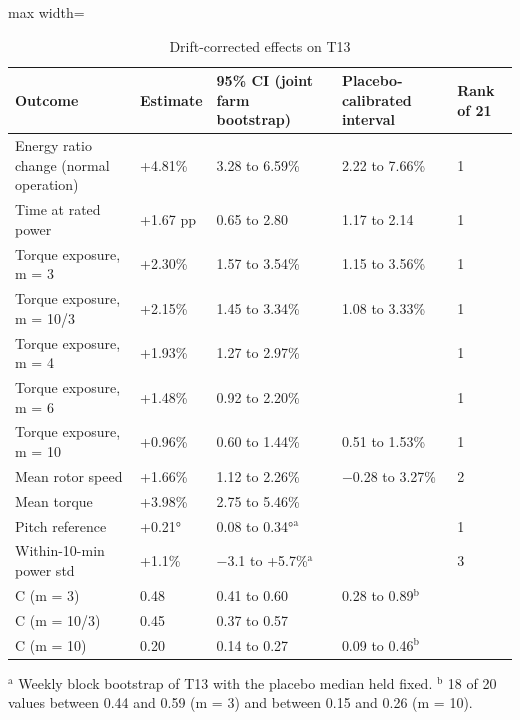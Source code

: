 \documentclass[preprint,12pt]{elsarticle}
\begin{document}
\begin{table}[htbp]
\centering
\caption{Drift-corrected effects on T13}
\label{tab:effects}
\small
\begin{adjustbox}{max width=\textwidth}
\begin{tabular}{lllll}
\toprule
Outcome & Estimate & 95\% CI (joint farm bootstrap) & Placebo-calibrated interval & Rank of 21 \\
\midrule
Energy ratio change (normal operation) & +4.81\% & 3.28 to 6.59\% & 2.22 to 7.66\% & 1 \\
Time at rated power & +1.67 pp & 0.65 to 2.80 & 1.17 to 2.14 & 1 \\
Torque exposure, m = 3 & +2.30\% & 1.57 to 3.54\% & 1.15 to 3.56\% & 1 \\
Torque exposure, m = 10/3 & +2.15\% & 1.45 to 3.34\% & 1.08 to 3.33\% & 1 \\
Torque exposure, m = 4 & +1.93\% & 1.27 to 2.97\% &  & 1 \\
Torque exposure, m = 6 & +1.48\% & 0.92 to 2.20\% &  & 1 \\
Torque exposure, m = 10 & +0.96\% & 0.60 to 1.44\% & 0.51 to 1.53\% & 1 \\
Mean rotor speed & +1.66\% & 1.12 to 2.26\% & $-$0.28 to 3.27\% & 2 \\
Mean torque & +3.98\% & 2.75 to 5.46\% &  &  \\
Pitch reference & +0.21° & 0.08 to 0.34°$^{\mathrm{a}}$ &  & 1 \\
Within-10-min power std & +1.1\% & $-$3.1 to +5.7\%$^{\mathrm{a}}$ &  & 3 \\
C (m = 3) & 0.48 & 0.41 to 0.60 & 0.28 to 0.89$^{\mathrm{b}}$ &  \\
C (m = 10/3) & 0.45 & 0.37 to 0.57 &  &  \\
C (m = 10) & 0.20 & 0.14 to 0.27 & 0.09 to 0.46$^{\mathrm{b}}$ &  \\
\bottomrule
\end{tabular}
\end{adjustbox}

\par\smallskip\parbox{0.95\textwidth}{\footnotesize $^{\mathrm{a}}$ Weekly block bootstrap of T13 with the placebo median held fixed. $^{\mathrm{b}}$ 18 of 20 values between 0.44 and 0.59 (m = 3) and between 0.15 and 0.26 (m = 10).}
\end{table}
\end{document}

